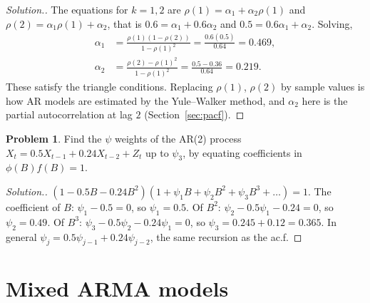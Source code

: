 \documentclass[11pt,a4paper]{article}
\theoremstyle{definition}
\newtheorem{problemx}{Problem}[subsection]
\newenvironment{problem}{\begin{problemx}}{\end{problemx}}
\newenvironment{solution}
  {\renewcommand{\qedsymbol}{}\begin{proof}[\textit{Solution}.]}
  {\end{proof}}
\begin{document}
\begin{solution}
The equations for $k = 1, 2$ are $\rho(1) = \alpha_1 + \alpha_2\rho(1)$ and $\rho(2) = \alpha_1\rho(1) + \alpha_2$, that is $0.6 = \alpha_1 + 0.6\alpha_2$ and $0.5 = 0.6\alpha_1 + \alpha_2$.
Solving,
\begin{align*}
\alpha_1 &= \frac{\rho(1)(1 - \rho(2))}{1 - \rho(1)^2} = \frac{0.6(0.5)}{0.64} = 0.469 , \\
\alpha_2 &= \frac{\rho(2) - \rho(1)^2}{1 - \rho(1)^2} = \frac{0.5 - 0.36}{0.64} = 0.219 .
\end{align*}
These satisfy the triangle conditions. Replacing $\rho(1)$, $\rho(2)$ by sample values is how AR models are estimated by the
Yule--Walker method, and $\alpha_2$ here is the partial autocorrelation at lag $2$ (Section~\ref{sec:pacf}).
\end{solution}

\begin{problem}\label{prob:ar1-psi}
Find the $\psi$ weights of the AR(2) process $X_t = 0.5X_{t-1} + 0.24X_{t-2} + Z_t$ up to $\psi_3$, by equating coefficients in $\phi(B)f(B) = 1$.
\end{problem}

\begin{solution}
$(1 - 0.5B - 0.24B^2)(1 + \psi_1B + \psi_2B^2 + \psi_3B^3 + \dots) = 1$. The coefficient of $B$: $\psi_1 - 0.5 = 0$, so $\psi_1 = 0.5$. Of $B^2$:
$\psi_2 - 0.5\psi_1 - 0.24 = 0$, so $\psi_2 = 0.49$. Of $B^3$: $\psi_3 - 0.5\psi_2 - 0.24\psi_1 = 0$, so $\psi_3 = 0.245 + 0.12 = 0.365$. In general
$\psi_j = 0.5\psi_{j-1} + 0.24\psi_{j-2}$, the same recursion as the ac.f.
\end{solution}

\section{Mixed ARMA models}\label{sec:arma}
\end{document}
